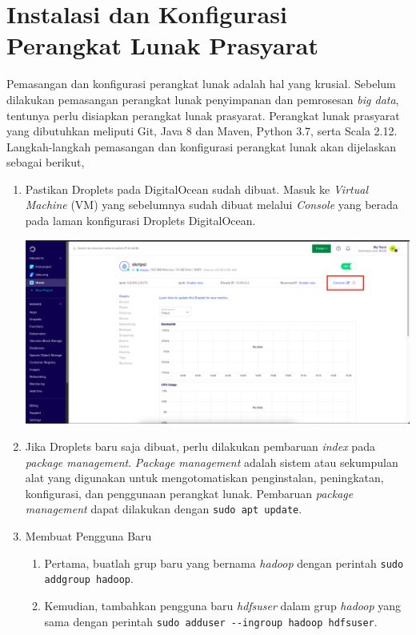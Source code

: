 \chapter{Instalasi dan Konfigurasi Perangkat Lunak Prasyarat}

Pemasangan dan konfigurasi perangkat lunak adalah hal yang krusial. Sebelum dilakukan pemasangan perangkat lunak penyimpanan dan pemrosesan \textit{big data}, tentunya perlu disiapkan perangkat lunak prasyarat. Perangkat lunak prasyarat yang dibutuhkan meliputi Git, Java 8 dan Maven, Python 3.7, serta Scala 2.12. Langkah-langkah pemasangan dan konfigurasi perangkat lunak akan dijelaskan sebagai berikut,

\begin{enumerate}
  \item Pastikan Droplets pada DigitalOcean sudah dibuat. Masuk ke \textit{Virtual Machine} (VM) yang sebelumnya sudah dibuat melalui \textit{Console} yang berada pada laman konfigurasi Droplets DigitalOcean.
	\begin{center}
	\includegraphics[width=1\linewidth]{figures/ch99/ap1/5.png}
	\end{center} 
  \item Jika Droplets baru saja dibuat, perlu dilakukan pembaruan \textit{index} pada \textit{package management}. \textit{Package management} adalah sistem atau sekumpulan alat yang digunakan untuk mengotomatiskan penginstalan, peningkatan, konfigurasi, dan penggunaan perangkat lunak. Pembaruan \textit{package management} dapat dilakukan dengan \verb|sudo apt update|. 
  \item Membuat Pengguna Baru   \begin{enumerate}
    \item Pertama, buatlah grup baru yang bernama \textit{hadoop} dengan perintah \verb|sudo addgroup hadoop|.
    \item Kemudian, tambahkan pengguna baru \textit{hdfsuser} dalam grup \textit{hadoop} yang sama dengan perintah \verb|sudo adduser --ingroup hadoop hdfsuser|.

\end{enumerate}
\end{enumerate}
